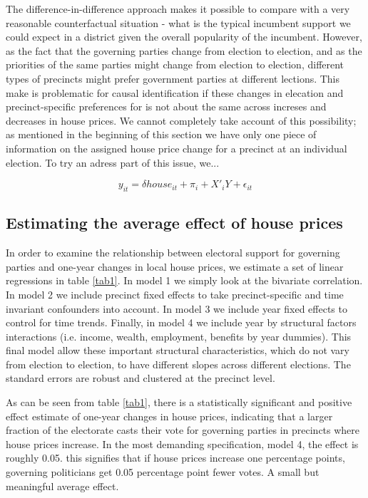 \documentclass[12pt,a4paper]{article}
\begin{document}
The difference-in-difference approach makes it possible to compare with a very reasonable counterfactual situation - what is the typical incumbent support we could expect in a district given the overall popularity of the incumbent. However, as the fact that the governing parties change from election to election, and as the priorities of the same parties might change from election to election, different types of precincts might prefer government parties at  different lections. This make is problematic for causal identification if these changes in elecation and precinct-specific preferences for is not about the same across increses and decreases in house prices. We cannot completely take account of this possibility; as mentioned in the beginning of this section we have only one piece of information on the assigned house price change for a precinct at an individual election. To try an adress part of this issue, we...


\begin{equation}
y_{it}= \delta house_{it} + \pi_i +  X'_iY + \epsilon_{it}
\end{equation}

\subsection{Estimating the average effect of house prices}
In order to examine the relationship between electoral support for governing parties and one-year changes in local house prices, we estimate a set of linear regressions in table \ref{tab1}. In model 1 we simply look at the bivariate correlation. In model 2 we include precinct fixed effects to take precinct-specific and time invariant confounders into account. In model 3 we include year fixed effects to control for time trends. Finally, in model 4 we include year by structural factors interactions (i.e. income, wealth, employment, benefits by year dummies). This final model allow these important structural characteristics, which do not vary from election to election, to have different slopes across different elections. The standard errors are robust and clustered at the precinct level.

As can be seen from table \ref{tab1}, there is a statistically significant and positive effect estimate of one-year changes in house prices, indicating that a larger fraction of the electorate casts their vote for governing parties in precincts where house prices increase. In the most demanding specification, model 4, the effect is roughly 0.05. this signifies that if house prices increase one percentage points, governing politicians get 0.05 percentage point fewer votes. A small but meaningful average effect.
\end{document}
